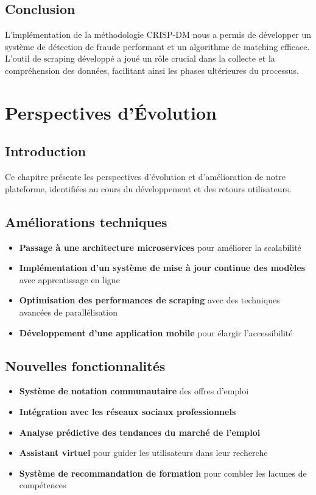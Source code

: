 \documentclass[10pt,a4paper,twocolumn]{article}
\begin{document}
\subsection{Conclusion}
L'implémentation de la méthodologie CRISP-DM nous a permis de développer un système de détection de fraude performant et un algorithme de matching efficace. L'outil de scraping développé a joué un rôle crucial dans la collecte et la compréhension des données, facilitant ainsi les phases ultérieures du processus.

\section{Perspectives d'Évolution}
\subsection{Introduction}
Ce chapitre présente les perspectives d'évolution et d'amélioration de notre plateforme, identifiées au cours du développement et des retours utilisateurs.

\subsection{Améliorations techniques}
\begin{itemize}
    \item \textbf{Passage à une architecture microservices} pour améliorer la scalabilité
    \item \textbf{Implémentation d'un système de mise à jour continue des modèles} avec apprentissage en ligne
    \item \textbf{Optimisation des performances de scraping} avec des techniques avancées de parallélisation
    \item \textbf{Développement d'une application mobile} pour élargir l'accessibilité
\end{itemize}

\subsection{Nouvelles fonctionnalités}
\begin{itemize}
    \item \textbf{Système de notation communautaire} des offres d'emploi
    \item \textbf{Intégration avec les réseaux sociaux professionnels}
    \item \textbf{Analyse prédictive des tendances du marché de l'emploi}
    \item \textbf{Assistant virtuel} pour guider les utilisateurs dans leur recherche
    \item \textbf{Système de recommandation de formation} pour combler les lacunes de compétences
\end{itemize}
\end{document}
